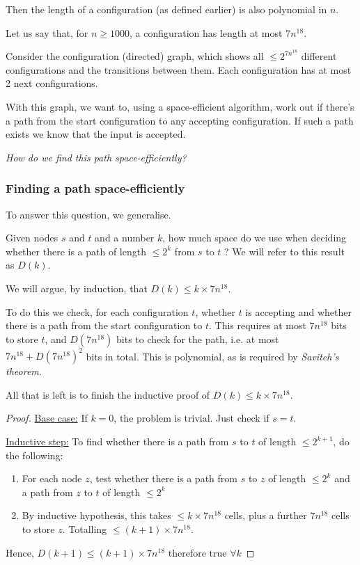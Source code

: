 \documentclass{article}
\begin{document}
Then the length of a configuration (as defined earlier) is also polynomial in $n$.

Let us say that, for $n \geq 1000$, a configuration has length at most $7n^{18}$.

Consider the configuration (directed) graph, which shows all $\leq 2^{7n^{18}}$ different configurations and the transitions between them. Each configuration has at most 2 next configurations.

With this graph, we want to, using a space-efficient algorithm, work out if there's a path from the start configuration to any accepting configuration. If such a path exists we know that the input is accepted.

\textit{How do we find this path space-efficiently?}


\subsubsection{Finding a path space-efficiently}

To answer this question, we generalise.

Given nodes $s$ and $t$ and a number $k$, how much space do we use when deciding whether there is a path of length $\leq 2^{k}$ from $s$ to $t$ ? We will refer to this result as $D(k)$.

We will argue, by induction, that $D(k) \leq k \times 7n^{18}$.

To do this we check, for each configuration $t$, whether $t$ is accepting and whether there is a path from the start configuration to $t$. This requires at most $7n^{18}$ bits to store $t$, and $D(7n^{18})$ bits to check for the path, i.e. at most $7n^{18} +  D(7n^{18})^{2}$ bits in total. This is polynomial, as is required by \textit{Savitch's theorem}.

All that is left is to finish the inductive proof of $D(k) \leq k \times 7n^{18}$.
\begin{proof}

\underline{Base case:} If $k=0$, the problem is trivial. Just check if $s=t$.

\underline{Inductive step:} To find whether there is a path from $s$ to $t$ of length $\leq 2^{k+1}$, do the following:
\begin{enumerate}
  \item For each node $z$, test whether there is a path from $s$ to $z$ of length $\leq 2^{k}$ and a path from $z$ to $t$ of length $\leq 2^{k}$
  \item By inductive hypothesis, this takes $\leq k \times 7n^{18}$ cells, plus a further $7n^{18}$ cells to store $z$. Totalling $\leq (k+1) \times 7n^{18}$.

\end{enumerate}

Hence, $D(k+1) \leq (k+1) \times 7n^{18}$ therefore true $\forall k$
\end{proof}
\end{document}
